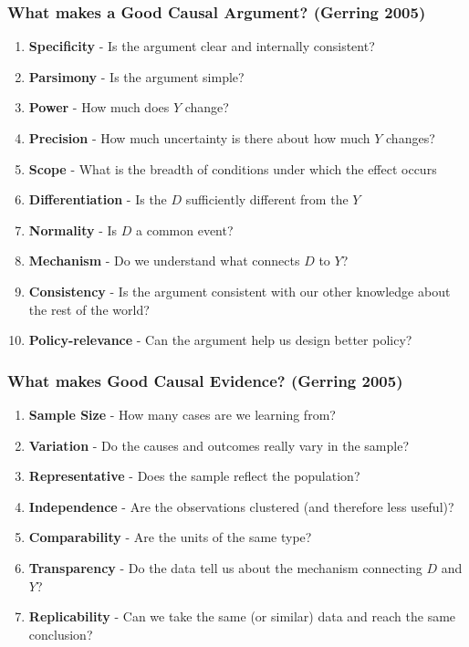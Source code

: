 \documentclass[xcolor=x11names,compress]{beamer}\usepackage[]{graphicx}\usepackage[]{color}
\renewcommand{\(}{\begin{columns}}
\renewcommand{\)}{\end{columns}}
\newcommand{\<}[1]{\begin{column}{#1}}
\renewcommand{\>}{\end{column}}
\begin{document}

\begin{frame}
\frametitle{What makes a Good Causal Argument? (Gerring 2005)}
\begin{enumerate}
\item \textbf{Specificity} - Is the argument clear and internally consistent?
\pause
\item \textbf{Parsimony} - Is the argument simple?
\pause
\item \textbf{Power} - How much does $Y$ change?
\pause
\item \textbf{Precision} - How much uncertainty is there about how much $Y$ changes?
\pause
\item \textbf{Scope} - What is the breadth of conditions under which the effect occurs
\pause
\item \textbf{Differentiation} - Is the $D$ sufficiently different from the $Y$
\pause
\item \textbf{Normality} - Is $D$ a common event?
\pause
\item \textbf{Mechanism} - Do we understand what connects $D$ to $Y$?
\pause
\item \textbf{Consistency} - Is the argument consistent with our other knowledge about the rest of the world?
\pause
\item \textbf{Policy-relevance} - Can the argument help us design better policy?
\end{enumerate}
\end{frame}

\begin{frame}
\frametitle{What makes Good Causal Evidence? (Gerring 2005)}
\begin{enumerate}
\item \textbf{Sample Size} - How many cases are we learning from?
\pause
\item \textbf{Variation} - Do the causes and outcomes really vary in the sample?
\pause
\item \textbf{Representative} - Does the sample reflect the population?
\pause
\item \textbf{Independence} - Are the observations clustered (and therefore less useful)?
\pause
\item \textbf{Comparability} - Are the units of the same type?
\pause
\item \textbf{Transparency} - Do the data tell us about the mechanism connecting $D$ and $Y$?
\pause
\item \textbf{Replicability} - Can we take the same (or similar) data and reach the same conclusion?
\end{enumerate}
\end{frame}
\end{document}
